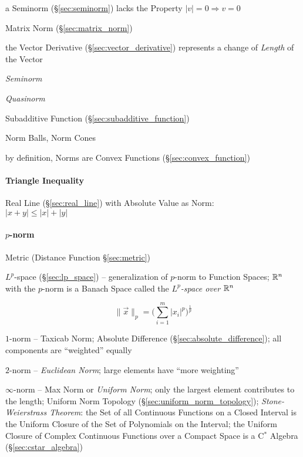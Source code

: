a Seminorm (\S\ref{sec:seminorm}) lacks the Property $|v| = 0 \Longrightarrow v
= 0$

\fist Matrix Norm (\S\ref{sec:matrix_norm})

the Vector Derivative (\S\ref{sec:vector_derivative}) represents a change of
\emph{Length} of the Vector

\emph{Seminorm}

\emph{Quasinorm}

Subadditive Function (\S\ref{sec:subadditive_function})

Norm Balls, Norm Cones

by definition, Norms are Convex Functions (\S\ref{sec:convex_function})



\paragraph{Triangle Inequality}\label{sec:triangle_inequality}\hfill

Real Line (\S\ref{sec:real_line}) with Absolute Value as Norm:\\
$|x + y| \leq |x| + |y|$



\paragraph{$p$-norm}\label{sec:p_norm}\hfill

\fist Metric (Distance Function \S\ref{sec:metric})

\fist $L^p$-space (\S\ref{sec:lp_space}) -- generalization of $p$-norm to
Function Spaces;
$\mathbb{R}^n$ with the $p$-norm is a Banach Space called the
\emph{$L^p$-space over $\mathbb{R}^n$}

\[
  \|\vec{x}\|_p = \Big(\sum_{i=1}^m|x_i|^p\Big)^{\frac{1}{p}}
\]

$1$-norm -- Taxicab Norm; Absolute Difference (\S\ref{sec:absolute_difference});
all components are ``weighted'' equally

$2$-norm -- \emph{Euclidean Norm}; large elements have ``more weighting''

$\infty$-norm -- Max Norm or \emph{Uniform Norm}; only the largest element
contributes to the length; Uniform Norm Topology
(\S\ref{sec:uniform_norm_topology}); \emph{Stone-Weierstrass Theorem}: the Set
of all Continuous Functions on a Closed Interval is the Uniform Closure of the
Set of Polynomials on the Interval;
the Uniform Closure of Complex Continuous Functions over a Compact Space is a
C$^*$ Algebra (\S\ref{sec:cstar_algebra})



